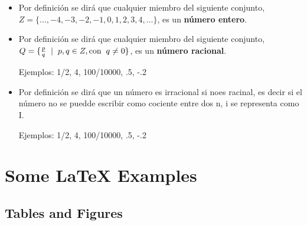 \documentclass{beamer}
\begin{document}
\begin{frame}

\begin{itemize}
\item Por definici\'on se dir\'a que cualquier miembro del siguiente conjunto, $Z = \{... , -4, -3, -2, -1, 0, 1, 2, 3, 4, … \}$, es un \textbf{número entero}. 

\item Por definici\'on se dir\'a que cualquier miembro del siguiente conjunto, $Q = \{ \frac{p}{q} \hspace{2mm} | \hspace{2mm} p, q \in Z, \text{con} \hspace{2mm} q \neq 0 \}$, es un \textbf{número racional}. 

Ejemplos: 1/2, 4, 100/10000, .5, -.2

\item Por definici\'on se dir\'a que un n\'umero es irracional si noes racinal, es decir si el n\'umero no se puedde escribir como cociente entre dos n\umeros, i se representa como I. 

Ejemplos: 1/2, 4, 100/10000, .5, -.2



\end{itemize}

\end{frame}


\section{Some \LaTeX{} Examples}

\subsection{Tables and Figures}
\end{document}

